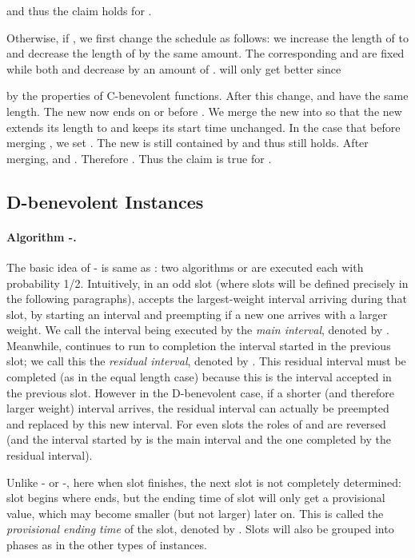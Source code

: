 \documentclass[11pt]{article}
\newcommand{\qed}{\hspace*{\fill}\par\medskip}
\newenvironment{proof}{\noindent{\it Proof. }\ignorespaces}{\qed}
\begin{document}
\begin{proof}
and thus the claim holds for .

Otherwise, if , we first change the schedule
 as follows: we increase the length of
 to  and decrease the length of  by the
same amount.  The corresponding  and  are
fixed while both  and  decrease by an amount
of .  
 will only get better since

by the properties of C-benevolent functions. 
After this change,  and  have the same length.
The new  now ends on or before .
We merge the new  into  so that the new 
extends its length to  and keeps its start time
 unchanged.  In the case that
 before merging , we set
.
The new  is still contained by 
and thus  still holds.
After merging,  and .  
Therefore
.
Thus the claim is true for .  
\end{proof}

\subsection{D-benevolent Instances}

\paragraph{Algorithm -.}
The basic idea of - is same as : 
two algorithms  or  are executed each with probability 1/2.
Intuitively, in an odd slot (where slots will be defined precisely 
in the following paragraphs), 
 accepts the largest-weight interval arriving during that slot, 
by starting an interval
and preempting if a new one arrives with a larger weight. We call the
interval being executed by  the {\it main interval}, denoted by . 
Meanwhile, 
continues to run to completion the interval started in the previous slot;
we call this the {\it residual interval}, denoted by .
This residual interval must be completed 
(as in the equal length case) because this is the interval accepted in the
previous slot. However in the D-benevolent case, 
if a shorter (and therefore larger weight) interval arrives, 
the residual interval can actually be preempted and replaced by this new
interval.  
For even slots the roles of  and  are reversed (and the interval
started by  is the main interval and the one completed by  the
residual interval).

Unlike - or -, here when slot  finishes, 
the next slot  is not completely determined: 
slot  begins where  ends,
but the ending time of slot  will only get a provisional value, 
which may become smaller (but not larger) later on. 
This is called the {\it provisional ending time} of the slot, 
denoted by .
Slots will also be grouped into phases as in the other types of instances.
\end{document}
